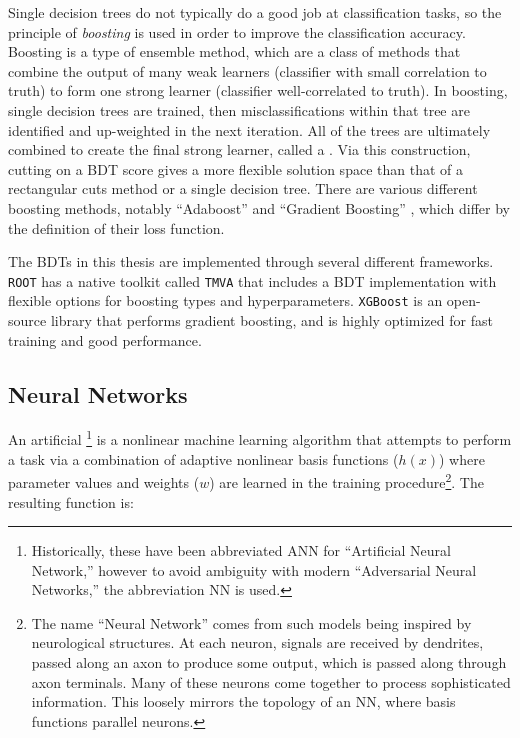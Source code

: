 Single decision trees do not typically do a good job at classification tasks, so the principle of \textit{boosting} is used in order to improve the classification accuracy. Boosting is a type of ensemble method, which are a class of methods that combine the output of many weak learners (classifier with small correlation to truth) to form one strong learner (classifier well-correlated to truth). In boosting, single decision trees are trained, then misclassifications within that tree are identified and up-weighted in the next iteration. All of the trees are ultimately combined to create the final strong learner, called a . Via this construction, cutting on a \gls{BDT} score gives a more flexible solution space than that of a rectangular cuts method or a single decision tree. There are various different boosting methods, notably ``Adaboost'' \cite{adaboost} and ``Gradient Boosting'' \cite{gradBoost}, which differ by the definition of their loss function.

The \glspl{BDT} in this thesis are implemented through several different frameworks. \texttt{ROOT} \cite{ROOT} has a native toolkit called \texttt{TMVA} \cite{TMVA} that includes a \gls{BDT} implementation with flexible options for boosting types and hyperparameters. \texttt{XGBoost} \cite{XGBoost} is an open-source library that performs gradient boosting, and is highly optimized for fast training and good performance.


\subsection{Neural Networks}\label{ssec:nn}

An artificial \footnote{Historically, these have been abbreviated ANN for ``Artificial Neural Network,'' however to avoid ambiguity with modern ``Adversarial Neural Networks,'' the abbreviation NN is used.} is a nonlinear machine learning algorithm that attempts to perform a task via a combination of adaptive nonlinear basis functions ($h(x)$) where parameter values and weights ($w$) are learned in the training procedure\footnote{The name ``Neural Network'' comes from such models being inspired by neurological structures. At each neuron, signals are received by dendrites, passed along an axon to produce some output, which is passed along through axon terminals. Many of these neurons come together to process sophisticated information. This loosely mirrors the topology of an \gls{NN}, where basis functions parallel neurons.}. The resulting function is:

